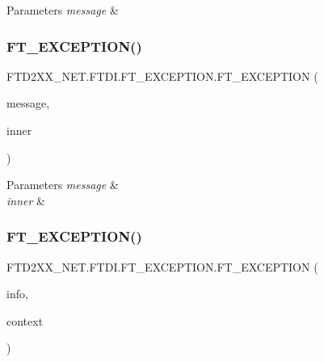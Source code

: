 \begin{DoxyParams}{Parameters}
{\em message} & \\
\hline
\end{DoxyParams}
\mbox{\label{class_f_t_d2_x_x___n_e_t_1_1_f_t_d_i_1_1_f_t___e_x_c_e_p_t_i_o_n_af96716378394183329c7f71eae5ad76b}} 
\subsubsection{\texorpdfstring{FT\_EXCEPTION()}{FT\_EXCEPTION()}\hspace{0.1cm}{\footnotesize\ttfamily [3/4]}}
{\footnotesize\ttfamily F\+T\+D2\+X\+X\+\_\+\+N\+E\+T.\+F\+T\+D\+I.\+F\+T\+\_\+\+E\+X\+C\+E\+P\+T\+I\+O\+N.\+F\+T\+\_\+\+E\+X\+C\+E\+P\+T\+I\+ON (\begin{DoxyParamCaption}\item[{string}]{message,  }\item[{Exception}]{inner }\end{DoxyParamCaption})}






\begin{DoxyParams}{Parameters}
{\em message} & \\
\hline
{\em inner} & \\
\hline
\end{DoxyParams}
\mbox{\label{class_f_t_d2_x_x___n_e_t_1_1_f_t_d_i_1_1_f_t___e_x_c_e_p_t_i_o_n_a8e5efcbe020c7107903f8555fb3a5c0a}} 
\subsubsection{\texorpdfstring{FT\_EXCEPTION()}{FT\_EXCEPTION()}\hspace{0.1cm}{\footnotesize\ttfamily [4/4]}}
{\footnotesize\ttfamily F\+T\+D2\+X\+X\+\_\+\+N\+E\+T.\+F\+T\+D\+I.\+F\+T\+\_\+\+E\+X\+C\+E\+P\+T\+I\+O\+N.\+F\+T\+\_\+\+E\+X\+C\+E\+P\+T\+I\+ON (\begin{DoxyParamCaption}\item[{System.\+Runtime.\+Serialization.\+Serialization\+Info}]{info,  }\item[{System.\+Runtime.\+Serialization.\+Streaming\+Context}]{context }\end{DoxyParamCaption})\hspace{0.3cm}{\ttfamily [protected]}}






